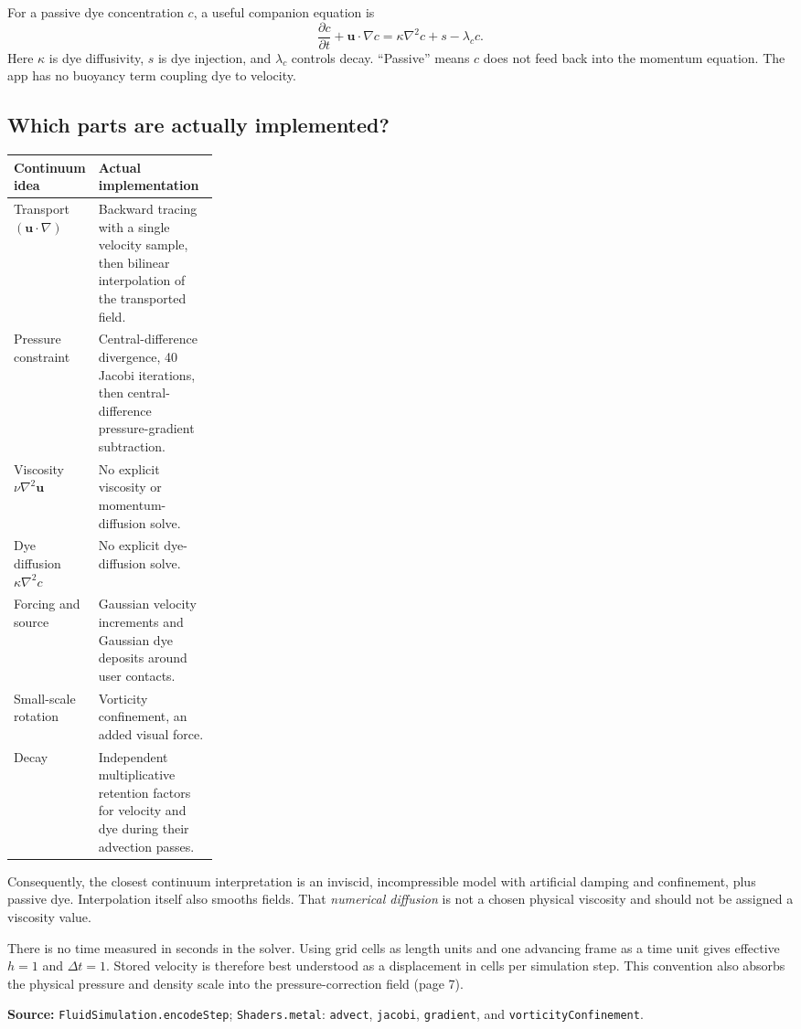 \documentclass[11pt,a4paper]{article}
\newcommand{\uvec}{\mathbf{u}}
\newcommand{\src}[1]{\par{\footnotesize\raggedright\color{teal}\textbf{Source:} #1\par}}
\newcommand{\code}[1]{\texttt{#1}}
\begin{document}
For a passive dye concentration $c$, a useful companion equation is
\begin{equation}
 \frac{\partial c}{\partial t}+\uvec\cdot\nabla c
 =\kappa\nabla^2c+s-\lambda_c c.\label{eq:dye}
\end{equation}
Here $\kappa$ is dye diffusivity, $s$ is dye injection, and $\lambda_c$ controls
decay. ``Passive'' means $c$ does not feed back into the momentum equation.
The app has no buoyancy term coupling dye to velocity.

\subsection*{Which parts are actually implemented?}
\begin{tabularx}{\linewidth}{@{}p{0.26\linewidth}Y@{}}
\toprule
Continuum idea & Actual implementation \\
\midrule
Transport $(\uvec\cdot\nabla)$ & Backward tracing with a single velocity sample,
then bilinear interpolation of the transported field. \\
Pressure constraint & Central-difference divergence, 40 Jacobi iterations,
then central-difference pressure-gradient subtraction. \\
Viscosity $\nu\nabla^2\uvec$ & No explicit viscosity or momentum-diffusion solve. \\
Dye diffusion $\kappa\nabla^2c$ & No explicit dye-diffusion solve. \\
Forcing and source & Gaussian velocity increments and Gaussian dye deposits
around user contacts. \\
Small-scale rotation & Vorticity confinement, an added visual force. \\
Decay & Independent multiplicative retention factors for velocity and dye during their advection passes. \\
\bottomrule
\end{tabularx}

Consequently, the closest continuum interpretation is an inviscid,
incompressible model with artificial damping and confinement, plus passive dye.
Interpolation itself also smooths fields. That \emph{numerical diffusion} is not
a chosen physical viscosity and should not be assigned a viscosity value.

There is no time measured in seconds in the solver. Using grid cells as length
units and one advancing frame as a time unit gives effective $h=1$ and
$\Delta t=1$. Stored velocity is therefore best understood as a displacement in
cells per simulation step. This convention also absorbs the physical pressure
and density scale into the pressure-correction field (page 7).
\src{\code{FluidSimulation.encodeStep}; \code{Shaders.metal}: \code{advect},
\code{jacobi}, \code{gradient}, and \code{vorticityConfinement}.}
\end{document}

